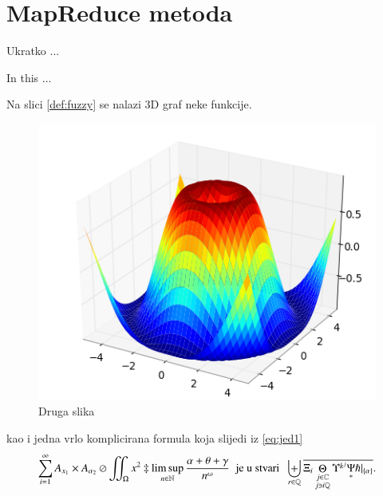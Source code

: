 \documentclass[a4paper,twoside,12pt]{memoir} %
\begin{document}
\section{MapReduce metoda}



\pagestyle{empty} %


\begin{sazetak}
Ukratko ...
\end{sazetak}

\begin{summary}
In this ...
\end{summary}


\begin{cv}
Na slici \ref{def:fuzzy} se nalazi 3D graf neke funkcije. 

\begin{figure}[h!t]
\centering \includegraphics{surface3d.png}
\caption{Druga slika}
\label{fig:3d}
\end{figure}

kao i jedna vrlo komplicirana formula koja slijedi iz \eqref{eq:jed1}
\[ \sum_{i=1}^{\infty}A_{x_1}\times A_{{\alpha}_2}\oslash\iint_{\Omega}x^2\ddagger\limsup_{n\in\mathbb{N}}\frac{\alpha+\theta+\gamma}{n^{\omega}}\;\;\text{je u stvari}\;\;\biguplus_{r\in\mathbb{Q}}\overline{\Xi_i \mathop\Theta_{\substack{j\in\mathbb{C} \\ j\ni i\mathbb{Q}}} \Upsilon^{k^j} \underset{\ast}{\Psi} \hslash\vert_{\{\alpha\}}}.\]
\end{cv}
\end{document}
